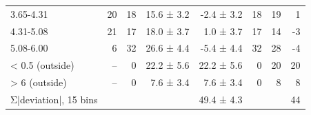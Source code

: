 \begin{table}[htbp]
\begin{tabular}{lrrrrrrr}
3.65-4.31 & 20 & 18 & 15.6 ± 3.2 & -2.4 ± 3.2 & 18 & 19 & 1 \\
4.31-5.08 & 21 & 17 & 18.0 ± 3.7 & 1.0 ± 3.7 & 17 & 14 & -3 \\
5.08-6.00 & 6 & 32 & 26.6 ± 4.4 & -5.4 ± 4.4 & 32 & 28 & -4 \\
< 0.5 (outside) & -- & 0 & 22.2 ± 5.6 & 22.2 ± 5.6 & 0 & 20 & 20 \\
> 6 (outside) & -- & 0 & 7.6 ± 3.4 & 7.6 ± 3.4 & 0 & 8 & 8 \\
Σ|deviation|, 15 bins &  &  &  & 49.4 ± 4.3 &  &  & 44 \\
\bottomrule
\end{tabular}
\end{table}
